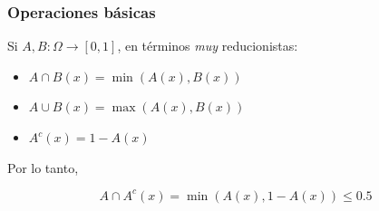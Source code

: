 \documentclass{beamer}
\theoremstyle{definition}
\begin{document}
\begin{frame}
\begin{center}
\end{center}  
\end{frame}

\begin{frame}
  \frametitle{Operaciones básicas}
  \begin{block}{Si $A, B : \Omega \to [0, 1]$, en términos \emph{muy} reducionistas:}
    
    \begin{itemize}
    \item $A \cap B (x) = \min(A(x), B(x))$
    \item $A \cup B (x) = \max(A(x), B(x))$
    \item $A^c(x) = 1 - A(x)$
    \end{itemize}    
  
  \end{block}
  \vspace{1cm}  
   Por lo tanto, 
   
   $$A \cap A^c (x) = \min(A(x), 1 - A(x)) \leq 0.5$$
  \end{frame}
\end{document}
